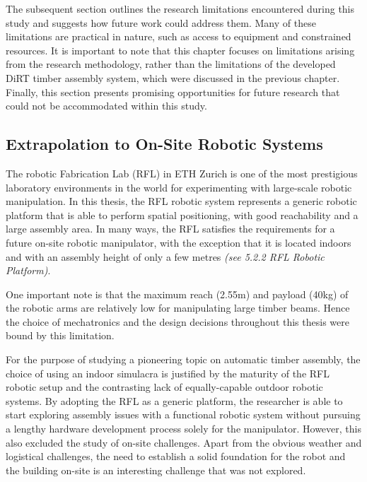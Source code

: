 The subsequent section outlines the research limitations encountered during this study and suggests how future work could address them. Many of these limitations are practical in nature, such as access to equipment and constrained resources. It is important to note that this chapter focuses on limitations arising from the research methodology, rather than the limitations of the developed DiRT timber assembly system, which were discussed in the previous chapter. Finally, this section presents promising opportunities for future research that could not be accommodated within this study.

\subsection{Extrapolation to On-Site Robotic Systems}
\label{subsection:extrapolation-to-on-site-robots}

The robotic Fabrication Lab (RFL) in ETH Zurich is one of the most prestigious laboratory environments in the world for experimenting with large-scale robotic manipulation. In this thesis, the RFL robotic system represents a generic robotic platform that is able to perform spatial positioning, with good reachability and a large assembly area. In many ways, the RFL satisfies the requirements for a future on-site robotic manipulator, with the exception that it is located indoors and with an assembly height of only a few metres \textit{(see 5.2.2 RFL Robotic Platform)}. 

One important note is that the maximum reach (2.55m) and payload (40kg) of the robotic arms are relatively low for manipulating large timber beams. Hence the choice of mechatronics and the design decisions throughout this thesis were bound by this limitation. 

For the purpose of studying a pioneering topic on automatic timber assembly, the choice of using an indoor simulacra is justified by the maturity of the RFL robotic setup and the contrasting lack of equally-capable outdoor robotic systems. By adopting the RFL as a generic platform, the researcher is able to start exploring assembly issues with a functional robotic system without pursuing a lengthy hardware development process solely for the manipulator. However, this also excluded the study of on-site challenges. Apart from the obvious weather and logistical challenges, the need to establish a solid foundation for the robot and the building on-site is an interesting challenge that was not explored. 

